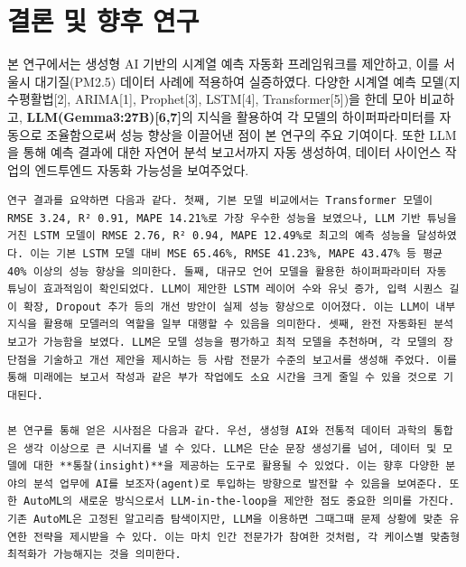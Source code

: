 \documentclass[12pt,ko,a4,]{report}
\begin{document}
\chapter{결론 및 향후 연구}

본 연구에서는 생성형 AI 기반의 시계열 예측 자동화 프레임워크를 제안하고,
이를 서울시 대기질(PM2.5) 데이터 사례에 적용하여 실증하였다. 다양한
시계열 예측 모델(지수평활법{[}2{]}, ARIMA{[}1{]}, Prophet{[}3{]},
LSTM{[}4{]}, Transformer{[}5{]})을 한데 모아 비교하고,
\textbf{LLM(Gemma3:27B){[}6,7{]}}의 지식을 활용하여 각 모델의
하이퍼파라미터를 자동으로 조율함으로써 성능 향상을 이끌어낸 점이 본
연구의 주요 기여이다. 또한 LLM을 통해 예측 결과에 대한 자연어 분석
보고서까지 자동 생성하여, 데이터 사이언스 작업의 엔드투엔드 자동화
가능성을 보여주었다.

\begin{lstlisting}
연구 결과를 요약하면 다음과 같다. 첫째, 기본 모델 비교에서는 Transformer 모델이 RMSE 3.24, R² 0.91, MAPE 14.21%로 가장 우수한 성능을 보였으나, LLM 기반 튜닝을 거친 LSTM 모델이 RMSE 2.76, R² 0.94, MAPE 12.49%로 최고의 예측 성능을 달성하였다. 이는 기본 LSTM 모델 대비 MSE 65.46%, RMSE 41.23%, MAPE 43.47% 등 평균 40% 이상의 성능 향상을 의미한다. 둘째, 대규모 언어 모델을 활용한 하이퍼파라미터 자동 튜닝이 효과적임이 확인되었다. LLM이 제안한 LSTM 레이어 수와 유닛 증가, 입력 시퀀스 길이 확장, Dropout 추가 등의 개선 방안이 실제 성능 향상으로 이어졌다. 이는 LLM이 내부 지식을 활용해 모델러의 역할을 일부 대행할 수 있음을 의미한다. 셋째, 완전 자동화된 분석 보고가 가능함을 보였다. LLM은 모델 성능을 평가하고 최적 모델을 추천하며, 각 모델의 장단점을 기술하고 개선 제안을 제시하는 등 사람 전문가 수준의 보고서를 생성해 주었다. 이를 통해 미래에는 보고서 작성과 같은 부가 작업에도 소요 시간을 크게 줄일 수 있을 것으로 기대된다.

본 연구를 통해 얻은 시사점은 다음과 같다. 우선, 생성형 AI와 전통적 데이터 과학의 통합은 생각 이상으로 큰 시너지를 낼 수 있다. LLM은 단순 문장 생성기를 넘어, 데이터 및 모델에 대한 **통찰(insight)**을 제공하는 도구로 활용될 수 있었다. 이는 향후 다양한 분야의 분석 업무에 AI를 보조자(agent)로 투입하는 방향으로 발전할 수 있음을 보여준다. 또한 AutoML의 새로운 방식으로서 LLM-in-the-loop을 제안한 점도 중요한 의미를 가진다. 기존 AutoML은 고정된 알고리즘 탐색이지만, LLM을 이용하면 그때그때 문제 상황에 맞춘 유연한 전략을 제시받을 수 있다. 이는 마치 인간 전문가가 참여한 것처럼, 각 케이스별 맞춤형 최적화가 가능해지는 것을 의미한다.


\end{lstlisting}
\end{document}
